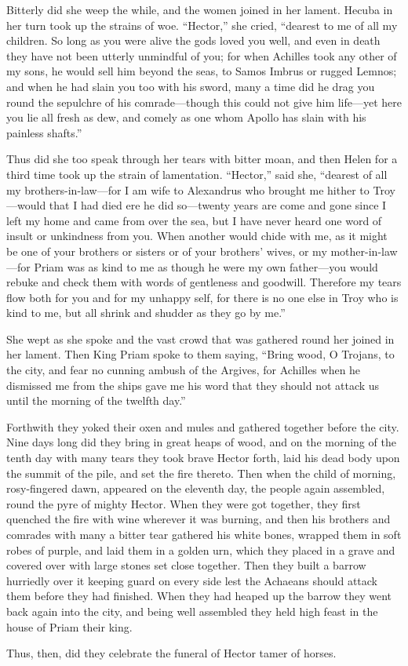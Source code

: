 Bitterly did she weep the while, and the women joined in her lament.
Hecuba in her turn took up the strains of woe. “Hector,” she cried,
“dearest to me of all my children. So long as you were alive the gods
loved you well, and even in death they have not been utterly unmindful of
you; for when Achilles took any other of my sons, he would sell him beyond
the seas, to Samos Imbrus or rugged Lemnos; and when he had slain you too
with his sword, many a time did he drag you round the sepulchre of his
comrade—though this could not give him life—yet here you lie
all fresh as dew, and comely as one whom Apollo has slain with his
painless shafts.”

Thus did she too speak through her tears with bitter moan, and then Helen
for a third time took up the strain of lamentation. “Hector,” said she,
“dearest of all my brothers-in-law—for I am wife to Alexandrus who
brought me hither to Troy—would that I had died ere he did so—twenty
years are come and gone since I left my home and came from over the sea,
but I have never heard one word of insult or unkindness from you. When
another would chide with me, as it might be one of your brothers or
sisters or of your brothers’ wives, or my mother-in-law—for Priam
was as kind to me as though he were my own father—you would rebuke
and check them with words of gentleness and goodwill. Therefore my tears
flow both for you and for my unhappy self, for there is no one else in
Troy who is kind to me, but all shrink and shudder as they go by me.”

She wept as she spoke and the vast crowd that was gathered round her
joined in her lament. Then King Priam spoke to them saying, “Bring wood, O
Trojans, to the city, and fear no cunning ambush of the Argives, for
Achilles when he dismissed me from the ships gave me his word that they
should not attack us until the morning of the twelfth day.”

Forthwith they yoked their oxen and mules and gathered together before the
city. Nine days long did they bring in great heaps of wood, and on the
morning of the tenth day with many tears they took brave Hector forth,
laid his dead body upon the summit of the pile, and set the fire thereto.
Then when the child of morning, rosy-fingered dawn, appeared on the
eleventh day, the people again assembled, round the pyre of mighty Hector.
When they were got together, they first quenched the fire with wine
wherever it was burning, and then his brothers and comrades with many a
bitter tear gathered his white bones, wrapped them in soft robes of
purple, and laid them in a golden urn, which they placed in a grave and
covered over with large stones set close together. Then they built a
barrow hurriedly over it keeping guard on every side lest the Achaeans
should attack them before they had finished. When they had heaped up the
barrow they went back again into the city, and being well assembled they
held high feast in the house of Priam their king.

Thus, then, did they celebrate the funeral of Hector tamer of horses.
